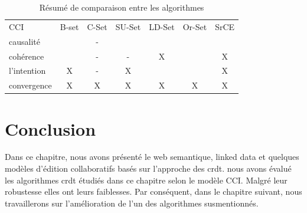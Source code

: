 \documentclass[12pt]{report}
\begin{document}
\begin{table}[]
\caption{Résumé de comparaison entre les algorithmes}
\label{table:comp}
\begin{tabular}{lcccccc}
CCI         & \multicolumn{1}{l}{B-set} & \multicolumn{1}{l}{C-Set} & \multicolumn{1}{l}{SU-Set} & \multicolumn{1}{l}{LD-Set} & \multicolumn{1}{l}{Or-Set} & \multicolumn{1}{l}{SrCE} \\
causalité   &                           & -                         &                            &                            &                            &                          \\
cohérence   &                           & -                         & -                          & X                          &                            & X                        \\
l'intention & X                         & -                         & X                          &                            &                            & X                        \\
convergence & X                         & X                         & X                          & X                          & X                          & X                       
\end{tabular}
\end{table}

\section*{Conclusion}
Dans ce chapitre, nous avons présenté le web semantique, linked data et quelques modèles d’édition collaboratifs basés sur l’approche des
\acs{crdt}. nous avons évalué les algorithmes \acs{crdt} étudiés dans ce chapitre selon le modèle CCI. Malgré leur robustesse elles ont leurs faiblesses. Par conséquent, dans le chapitre suivant, nous travaillerons sur l'amélioration de l'un des algorithmes susmentionnés.
 

 

\end{document}
